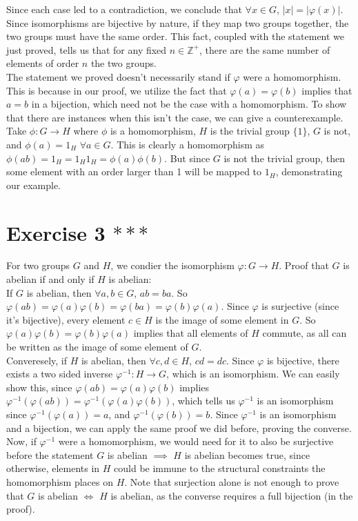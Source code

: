 \documentclass{article}
\newcommand{\Z}{\mathbb{Z}}
\begin{document}
    Since each case led to a contradiction,
    we conclude that $\forall x \in G$, $|x| = |\varphi(x)|$. \\
    Since isomorphisms are bijective by nature,
    if they map two groups together,
    the two groups must have the same order.
    This fact, coupled with the statement we just proved,
    tells us that for any fixed $n \in \Z^+$,
    there are the same number of elements of order $n$ the two groups. \\
    The statement we proved doesn't necessarily stand
    if $\varphi$ were a homomorphism.
    This is because in our proof, we utilize the fact that
    $\varphi(a) = \varphi(b)$ implies that $a = b$ in a bijection,
    which need not be the case with a homomorphism.
    To show that there are instances when this isn't the case,
    we can give a counterexample. \\
    Take $\phi: G \to H$ where $\phi$ is a homomorphism,
    $H$ is the trivial group $\{1\}$, $G$ is not,
    and $\phi(a) = 1_H$ $\forall a \in G$.
    This is clearly a homomorphism
    as $\phi(ab) = 1_H = 1_H1_H = \phi(a)\phi(b)$.
    But since $G$ is not the trivial group,
    then some element with an order larger than 1 will be mapped to $1_H$,
    demonstrating our example.


    \section*{Exercise 3 $***$}
    For two groups $G$ and $H$, we condier the isomorphism $\varphi: G \to H$.
    Proof that $G$ is abelian if and only if $H$ is abelian: \\
    If $G$ is abelian,
    then $\forall a, b \in G$, $ab = ba$.
    So $\varphi(ab) = \varphi(a)\varphi(b)
    = \varphi(ba)
    = \varphi(b)\varphi(a)$.
    Since $\varphi$ is surjective (since it's bijective),
    every element $c \in H$ is the image of some element in $G$.
    So $\varphi(a)\varphi(b) = \varphi(b)\varphi(a)$
    implies that all elements of $H$ commute,
    as all can be written as the image of some element of $G$. \\
    Converesely, if $H$ is abelian, 
    then $\forall c, d \in H$, $cd = dc$.
    Since $\varphi$ is bijective,
    there exists a two sided inverse $\varphi^{-1}: H \to G$,
    which is an isomorphism.
    We can easily show this,
    since $\varphi(ab) = \varphi(a)\varphi(b)$
    implies $\varphi^{-1}(\varphi(ab)) = \varphi^{-1}(\varphi(a)\varphi(b))$,
    which tells us $\varphi^{-1}$ is an isomorphism
    since $\varphi^{-1}(\varphi(a)) = a$,
    and $\varphi^{-1}(\varphi(b)) = b$.
    Since $\varphi^{-1}$ is an isomorphism and a bijection,
    we can apply the same proof we did before, proving the converse. \\
    Now, if $\varphi^{-1}$ were a homomorphism,
    we would need for it to also be surjective before the statement
    $G$ is abelian $\implies$ $H$ is abelian becomes true,
    since otherwise, elements in $H$ could be immune to the structural
    constraints the homomorphism places on $H$.
    Note that surjection alone is not enough to prove that 
    $G$ is abelian $\iff$ $H$ is abelian,
    as the converse requires a full bijection (in the proof). 
\end{document}
